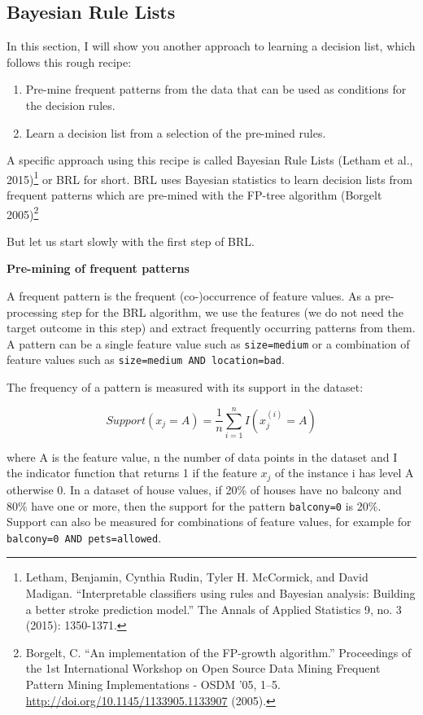 \documentclass[
  11pt,
]{scrbook}
\providecommand{\tightlist}{%
  \setlength{\itemsep}{0pt}\setlength{\parskip}{0pt}}
\begin{document}
\hypertarget{bayesian-rule-lists}{%
\subsection{Bayesian Rule Lists}\label{bayesian-rule-lists}}

In this section, I will show you another approach to learning a decision list, which follows this rough recipe:

\begin{enumerate}
\def\labelenumi{\arabic{enumi}.}
\tightlist
\item
  Pre-mine frequent patterns from the data that can be used as conditions for the decision rules.
\item
  Learn a decision list from a selection of the pre-mined rules.
\end{enumerate}

A specific approach using this recipe is called Bayesian Rule Lists (Letham et al., 2015)\footnote{Letham, Benjamin, Cynthia Rudin, Tyler H. McCormick, and David Madigan. ``Interpretable classifiers using rules and Bayesian analysis: Building a better stroke prediction model.'' The Annals of Applied Statistics 9, no. 3 (2015): 1350-1371.} or BRL for short.
BRL uses Bayesian statistics to learn decision lists from frequent patterns which are pre-mined with the FP-tree algorithm (Borgelt 2005)\footnote{Borgelt, C. ``An implementation of the FP-growth algorithm.'' Proceedings of the 1st International Workshop on Open Source Data Mining Frequent Pattern Mining Implementations - OSDM '05, 1--5. \url{http://doi.org/10.1145/1133905.1133907} (2005).}

But let us start slowly with the first step of BRL.

\textbf{Pre-mining of frequent patterns}

A frequent pattern is the frequent (co-)occurrence of feature values.
As a pre-processing step for the BRL algorithm, we use the features (we do not need the target outcome in this step) and extract frequently occurring patterns from them.
A pattern can be a single feature value such as \texttt{size=medium} or a combination of feature values such as \texttt{size=medium\ AND\ location=bad}.

The frequency of a pattern is measured with its support in the dataset:

\[Support(x_j=A)=\frac{1}n{}\sum_{i=1}^nI(x^{(i)}_{j}=A)\]

where A is the feature value, n the number of data points in the dataset and I the indicator function that returns 1 if the feature \(x_j\) of the instance i has level A otherwise 0.
In a dataset of house values, if 20\% of houses have no balcony and 80\% have one or more, then the support for the pattern \texttt{balcony=0} is 20\%.
Support can also be measured for combinations of feature values, for example for \texttt{balcony=0\ AND\ pets=allowed}.
\end{document}
